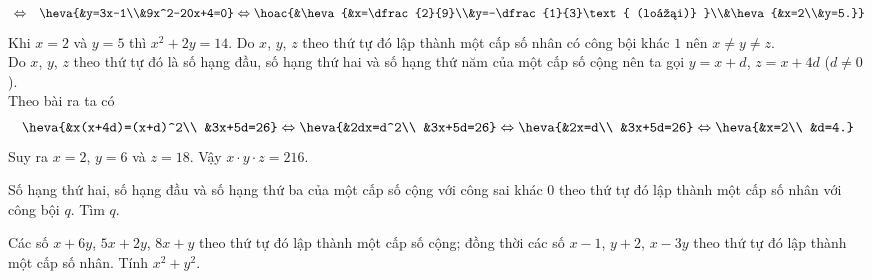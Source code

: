 \begin{ex}
{\begin{itemchoice}
{\begin{eqnarray*}
    &\Leftrightarrow&
   \heva{&y=3x-1\\&9x^2-20x+4=0} 
   \Leftrightarrow 
   \hoac{&\heva{&x=\dfrac{2}{9}\\&y=-\dfrac{1}{3}\text{  (loại)} }\\&\heva{&x=2\\&y=5.}}
  \end{eqnarray*}}
  Khi $x=2$ và $y=5$  thì $x^2+2y=14$.
  \itemch Do $x$, $y$, $z$ theo thứ tự đó lập thành một cấp số nhân có công bội  khác $1$ nên $x\ne y\ne z$.\\
  Do $x$, $y$, $z$  theo thứ tự đó là số hạng đầu, số hạng thứ hai và số hạng thứ năm của một cấp số cộng nên ta gọi $y=x+d$, $z=x+4d$ ($d\ne 0$).\\
  Theo  bài ra ta có
  $$\heva{&x(x+4d)=(x+d)^2\\  &3x+5d=26}\Leftrightarrow\heva{&2dx=d^2\\ &3x+5d=26}\Leftrightarrow\heva{&2x=d\\ &3x+5d=26}\Leftrightarrow \heva{&x=2\\ &d=4.}$$
  Suy  ra $x=2$, $y=6$ và $z=18$. Vậy $x\cdot y\cdot z=216$.
 \end{itemchoice}
  }
\end{ex}



\begin{ex}%
	Số hạng thứ hai, số hạng đầu và số hạng thứ ba của một cấp số cộng với công sai khác $0$ theo thứ tự đó lập thành một cấp số  nhân với công bội $q$. Tìm $q$.
\end{ex}

\begin{ex}%
	Các số $x + 6y$, $5x + 2y$, $8x + y$  theo thứ tự đó lập thành một cấp số cộng; đồng thời các số $x - 1$, $y + 2$, $x - 3y$ theo thứ tự đó lập thành một cấp số nhân. Tính $x^2 + y^2$.
\end{ex}

